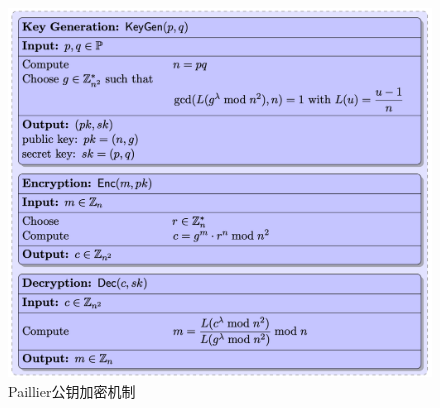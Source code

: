 \documentclass{article}
\begin{document}
\begin{figure}[h]
\centering
\includegraphics[width=\textwidth]{paillier.png}
\caption{Paillier公钥加密机制}\label{fig-paillier}
\end{figure}
\end{document}
